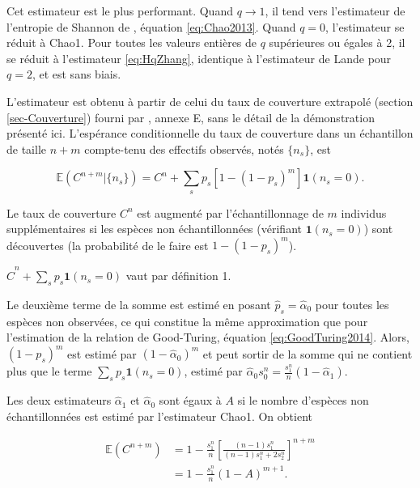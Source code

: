 \documentclass[
  11pt,
  french,
  a4paper,
  extrafontsizes,onecolumn,openright
  ]{memoir}
\newlength{\rf}
\begin{document}
Cet estimateur est le plus performant. Quand \(q \to 1\), il tend vers l'estimateur de l'entropie de Shannon de \textcite{Chao2013}, équation \eqref{eq:Chao2013}.
Quand \(q=0\), l'estimateur se réduit à Chao1. Pour toutes les valeurs entières de \(q\) supérieures ou égales à 2, il se réduit à l'estimateur \eqref{eq:HqZhang}, identique à l'estimateur de Lande pour \(q=2\), et est sans biais.

L'estimateur est obtenu à partir de celui du taux de couverture extrapolé (section \ref{sec-Couverture}) fourni par \textcite{Chao2012b}, annexe E, sans le détail de la démonstration présenté ici.
L'espérance conditionnelle du taux de couverture dans un échantillon de taille \(n+m\) compte-tenu des effectifs observés, notés \(\{n_s\}\), est

\begin{equation}
  \label{eq:EspCnm}
  {\mathbb E}\left(C^{n+m} | \{n_s\} \right)
  = C^{n} + \sum_s{p_s [1-(1-p_s)^m] \mathbf{1}(n_s=0)}.
\end{equation}

Le taux de couverture \(C^{n}\) est augmenté par l'échantillonnage de \(m\) individus supplémentaires si les espèces non échantillonnées (vérifiant \(\mathbf{1}(n_s=0)\)) sont découvertes (la probabilité de le faire est \(1-(1-p_s)^m\)).

\(\hat{C}^{n} + \sum_s{p_s \mathbf{1}(n_s=0)}\) vaut par définition 1.

Le deuxième terme de la somme est estimé en posant \(\hat{p}_s = \hat{\alpha}_0\) pour toutes les espèces non observées, ce qui constitue la même approximation que pour l'estimation de la relation de Good-Turing, équation \eqref{eq:GoodTuring2014}.
Alors, \((1-p_s)^m\) est estimé par \((1-\hat{\alpha}_0)^m\) et peut sortir de la somme qui ne contient plus que le terme \(\sum_s{p_s}\mathbf{1}(n_s=0)\), estimé par \(\hat{\alpha}_0 {s^{n}_{0}} = \frac{s^{n}_{1}}{n}(1 - \hat{\alpha}_1)\).

Les deux estimateurs \(\hat{\alpha}_1\) et \(\hat{\alpha}_0\) sont égaux à \(A\) si le nombre d'espèces non échantillonnées est estimé par l'estimateur Chao1.
On obtient

\begin{align} 
  \label{eq:Cnm}
  {\mathbb E}\left(C^{n+m} \right)
  &= 1-\frac{s^{n}_{1}}{n} 
    \left[ \frac{\left(n-1\right)s^{n}_{1}}{\left(n-1\right)s^{n}_{1}+2s^{n}_{2}} \right]^{n+m} \\
  &= 1-\frac{s^{n}_{1}}{n} \left( 1-A \right)^{m+1}.
\end{align}
\end{document}
